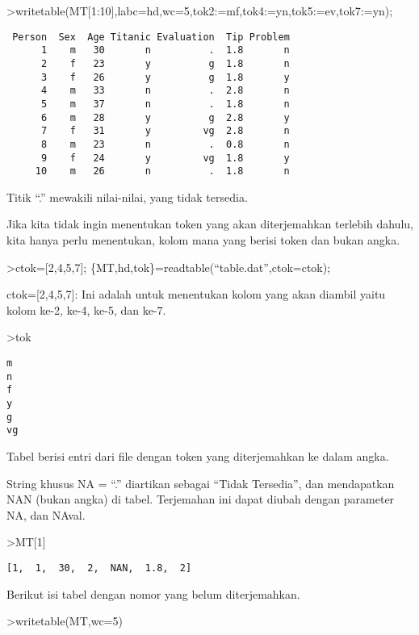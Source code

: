 \documentclass[
]{book}
\begin{document}
\textgreater writetable(MT{[}1:10{]},labc=hd,wc=5,tok2:=mf,tok4:=yn,tok5:=ev,tok7:=yn);

\begin{verbatim}
 Person  Sex  Age Titanic Evaluation  Tip Problem
      1    m   30       n          .  1.8       n
      2    f   23       y          g  1.8       n
      3    f   26       y          g  1.8       y
      4    m   33       n          .  2.8       n
      5    m   37       n          .  1.8       n
      6    m   28       y          g  2.8       y
      7    f   31       y         vg  2.8       n
      8    m   23       n          .  0.8       n
      9    f   24       y         vg  1.8       y
     10    m   26       n          .  1.8       n
\end{verbatim}

Titik ``.'' mewakili nilai-nilai, yang tidak tersedia.

Jika kita tidak ingin menentukan token yang akan diterjemahkan terlebih dahulu, kita hanya perlu menentukan, kolom mana yang berisi token dan bukan angka.

\textgreater ctok={[}2,4,5,7{]}; \{MT,hd,tok\}=readtable(``table.dat'',ctok=ctok);

ctok={[}2,4,5,7{]}: Ini adalah untuk menentukan kolom yang akan diambil yaitu kolom ke-2, ke-4, ke-5, dan ke-7.

\textgreater tok

\begin{verbatim}
m
n
f
y
g
vg
\end{verbatim}

Tabel berisi entri dari file dengan token yang diterjemahkan ke dalam angka.

String khusus NA = ``.'' diartikan sebagai ``Tidak Tersedia'', dan mendapatkan NAN (bukan angka) di tabel. Terjemahan ini dapat diubah dengan parameter NA, dan NAval.

\textgreater MT{[}1{]}

\begin{verbatim}
[1,  1,  30,  2,  NAN,  1.8,  2]
\end{verbatim}

Berikut isi tabel dengan nomor yang belum diterjemahkan.

\textgreater writetable(MT,wc=5)
\end{document}
